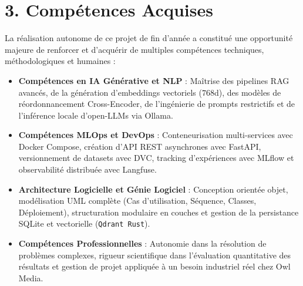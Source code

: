 \section*{3. Compétences Acquises}
La réalisation autonome de ce projet de fin d'année a constitué une opportunité majeure de renforcer et d'acquérir de multiples compétences techniques, méthodologiques et humaines :
\begin{itemize}
    \item \textbf{Compétences en IA Générative et NLP} : Maîtrise des pipelines RAG avancés, de la génération d'embeddings vectoriels ($768$d), des modèles de réordonnancement Cross-Encoder, de l'ingénierie de prompts restrictifs et de l'inférence locale d'open-LLMs via Ollama.
    \item \textbf{Compétences MLOps et DevOps} : Conteneurisation multi-services avec Docker Compose, création d'API REST asynchrones avec FastAPI, versionnement de datasets avec DVC, tracking d'expériences avec MLflow et observabilité distribuée avec Langfuse.
    \item \textbf{Architecture Logicielle et Génie Logiciel} : Conception orientée objet, modélisation UML complète (Cas d'utilisation, Séquence, Classes, Déploiement), structuration modulaire en couches et gestion de la persistance SQLite et vectorielle (\texttt{Qdrant Rust}).
    \item \textbf{Compétences Professionnelles} : Autonomie dans la résolution de problèmes complexes, rigueur scientifique dans l'évaluation quantitative des résultats et gestion de projet appliquée à un besoin industriel réel chez Owl Media.
\end{itemize}

